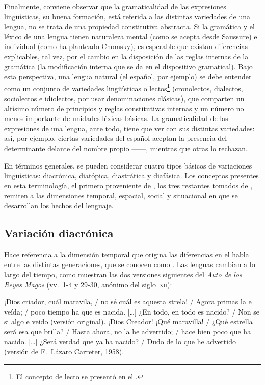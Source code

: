 Finalmente, conviene observar que la gramaticalidad de las expresiones
lingüísticas, su buena formación, está referida a las distintas variedades de
una lengua, no se trata de una propiedad constitutiva abstracta. Si la gramática
y el léxico de una lengua tienen naturaleza mental (como se acepta desde
Saussure) e individual (como ha planteado Chomsky), es esperable que existan
diferencias explicables, tal vez, por el cambio en la disposición de las reglas
internas de la gramática (la modificación interna que se da en el dispositivo
gramatical). Bajo esta perspectiva, una lengua natural (el español, por
ejemplo) se debe entender como un conjunto de variedades lingüísticas o
lectos\footnote{El concepto de lecto se presentó en el .}
(cronolectos, dialectos, sociolectos e idiolectos, por usar denominaciones
clásicas), que comparten un altísimo número de principios y reglas
constitutivas internas y un número no menos importante de unidades léxicas
básicas. La gramaticalidad de las expresiones de una lengua, ante todo, tiene
que ver con sus distintas variedades: así, por ejemplo, ciertas variedades del
español aceptan la presencia del determinante delante del nombre propio
------, mientras que otras lo rechazan.

En términos generales, se pueden considerar cuatro tipos básicos de variaciones
lingüísticas: diacrónica, diatópica, diastrática y diafásica. Los conceptos
presentes en esta terminología, el primero proveniente de \textcite{saussure1945},
los tres restantes tomados de \textcite{coseriu1969}, remiten a las dimensiones
temporal, espacial, social y situacional en que se desarrollan los hechos del
lenguaje.

\subsection{Variación diacrónica}

Hace referencia a la dimensión temporal que origina las diferencias en el habla
entre las distintas generaciones, que se conocen como . Las
lenguas cambian a lo largo del tiempo, como muestran las dos versiones
siguientes del \textit{Auto de los Reyes Magos} (vv.~1-4 y 29-30, anónimo del
siglo~\textsc{xii}):

\begin{exe}
  \ex\label{ex:02-reyes}
    \begin{xlist}
      \ex\label{ex:02-reyes-a} ¡Dios criador, cuál maravila, / no sé cuál es
          aquesta strela! / Agora primas la e veída; / poco tiempo ha que es
          nacida. [\ldots] ¿En todo, en todo es nacido? / Non se si algo e veido
          (versión original).
      \ex\label{ex:02-reyes-b} ¡Dios Creador! ¡Qué maravilla! / ¿Qué estrella
          será esa que brilla? / Hasta ahora, no la he advertido; / hace bien
          poco que ha nacido. [\ldots] ¿Será verdad que ya ha nacido? / Dudo de
          lo que he advertido (versión de F.~Lázaro Carreter,
          1958).
    \end{xlist}
\end{exe}

